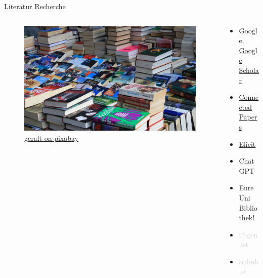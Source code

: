 \begin{frame}{Literatur Recherche}
    \begin{columns}[t]
        \begin{column}{0.39\textwidth}      
            \vspace{-2em} 
            \begin{figure}[t]
                \begin{flushleft}
                    \includegraphics[height=0.8\textheight,trim={11cm 0 15cm 0},clip]{graphics/Flohmarkt.jpg}         
                    \caption*{\href{https://pixabay.com/de/photos/flohmarkt-bücher-kiste-stöbern-237460/}{geralt on pixabay}}    
                \end{flushleft}
            \end{figure}
        \end{column}        
        \begin{column}{0.69\textwidth}
            \begin{itemize}
                \item Google, \href{https://scholar.google.com/}{Google Scholar}
                \item \href{https://www.connectedpapers.com/}{Connected Papers}
                \item \href{https://elicit.com/}{Elicit}
                \item ChatGPT
                \item Eure Uni Bibliothek!
            \end{itemize}           
            \vspace{1cm}            
            \begin{itemize}
                \item \textcolor{lightgray}{libgen.ist}
                \item \textcolor{lightgray}{scihub.st}
            \end{itemize} 
        \end{column}        
    \end{columns}  
\end{frame}


